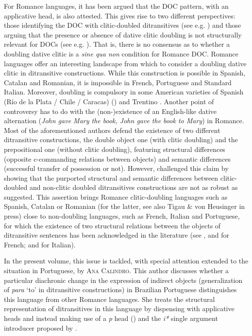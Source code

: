 \documentclass[output=paper,modfonts,nonflat,colorlinks,citecolor=brown]{langsci/langscibook}
\begin{document}
For Romance languages, it has been argued that the DOC pattern, with an applicative head, is also attested. This gives rise to two different perspectives: those identifying the DOC with clitic-doubled ditransitives (see e.g. \citealt{Cuervo2003}) and those arguing that the presence or absence of dative clitic doubling is not structurally relevant for DOCs (see e.g. \citealt{Pineda2013, Pineda2016, PinedaPress}). That is, there is no consensus as to whether a doubling dative clitic is a {\textit{sine qua non}} condition for Romance DOC. Romance languages offer an interesting landscape from which to consider a doubling dative clitic in ditransitive constructions. While this construction is possible in Spanish, Catalan and Romanian, it is impossible in French, Portuguese and Standard Italian. Moreover, doubling is compulsory in some American varieties of Spanish (Río de la Plata / Chile / Caracas) (\citealt{Parodi1998,Senn2008,Pujalte2009}) and Trentino \citep{Cordin1993}. Another point of controversy has to do with the (non-)existence of an English-like dative alternation (\textit{John gave Mary the book, John gave the book to Mary}) in Romance. Most of the aforementioned authors defend the existence of two different ditransitive constructions, the double object one (with clitic doubling) and the prepositional one (without clitic doubling), featuring structural differences (opposite c-commanding relations between objects) and semantic differences (successful transfer of possession or not). However, \citet{Pineda2013,Pineda2016,Pinedainpressa} challenged this claim by showing that the purported structural and semantic differences between clitic-doubled and non-clitic doubled ditransitives constructions are not as robust as suggested. This assertion brings Romance clitic-doubling languages such as Spanish, Catalan or Romanian (for the latter, see also Tigau \& von Heusinger in press) close to non-doubling languages, such as French, Italian and Portuguese, for which the existence of two structural relations between the objects of ditransitive sentences has been acknowledged in the literature (see \citealt{Harley2002,Anagnostopoulou2003,Fournier2010}, and \citealt{BonehNash2011} for French; and \citealt{GiorgiLongobardi1991,McGinnis2001,Harley2002} for Italian).



In the present volume, this issue is tackled, with special attention extended to the situation in Portuguese, by {\textsc{Ana Calindro.}}  This author discusses whether a particular diachronic change in the expression of indirect objects (generalization of {\textit{para}} ‘to’ in ditransitive constructions) in Brazilian Portuguese distinguishes this language from other Romance languages. She treats the structural representation of ditransitives in this language by dispensing with applicative heads and instead making use of a {\textit{p}} head (\citealt{Svenonius2003, Svenonius2004Arguments, Wood2012}) and the {\textit{i*}} single argument introducer proposed by \citet{WoodMarantz2017}.
\end{document}
